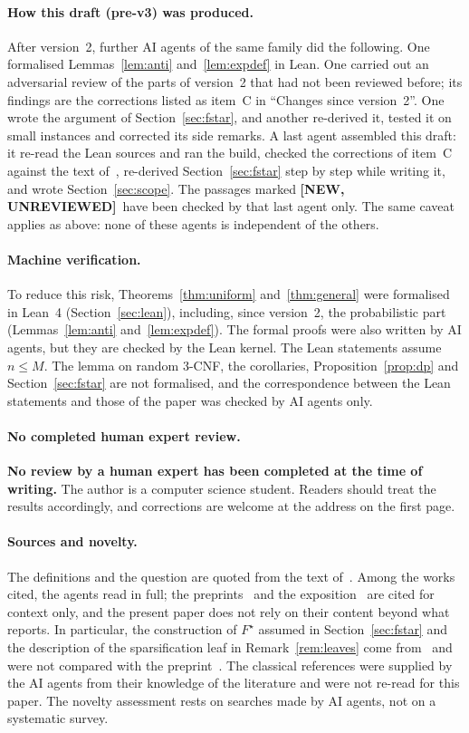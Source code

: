 \documentclass[11pt,a4paper]{article}
\newcommand{\NEWU}{\textbf{[NEW, UNREVIEWED]}}
\theoremstyle{definition}
\theoremstyle{remark}
\begin{document}
\paragraph{How this draft (pre-v3) was produced.} After version~2, further AI agents of the
same family did the following. One formalised Lemmas~\ref{lem:anti} and~\ref{lem:expdef} in
Lean. One carried out an adversarial review of the parts of version~2 that had not been
reviewed before; its findings are the corrections listed as item~C in ``Changes since
version~2''. One wrote the argument of Section~\ref{sec:fstar}, and another re-derived it,
tested it on small instances and corrected its side remarks. A last agent assembled this
draft: it re-read the Lean sources and ran the build, checked the corrections of item~C
against the text of~\cite{DL}, re-derived Section~\ref{sec:fstar} step by step while writing
it, and wrote Section~\ref{sec:scope}. The passages marked \NEWU\ have been checked by that
last agent only. The same caveat applies as above: none of these agents is independent of
the others.

\paragraph{Machine verification.} To reduce this risk, Theorems~\ref{thm:uniform}
and~\ref{thm:general} were formalised in Lean~4 (Section~\ref{sec:lean}), including, since
version~2, the probabilistic part (Lemmas~\ref{lem:anti} and~\ref{lem:expdef}). The formal
proofs were also written by AI agents, but they are checked by the Lean kernel. The Lean
statements assume $n\le M$. The lemma on random 3-CNF, the corollaries,
Proposition~\ref{prop:dp} and Section~\ref{sec:fstar} are not formalised, and the
correspondence between the Lean statements and those of the paper was checked by AI agents
only.

\paragraph{No completed human expert review.} \textbf{No review by a human expert has been
completed at the time of writing.} The author is a computer science student. Readers should treat the
results accordingly, and corrections are welcome at the address on the first page.

\paragraph{Sources and novelty.} The definitions and the question are quoted from the text
of~\cite{DL}. Among the works cited, the agents read \cite{DL} in full; the
preprints~\cite{OpenAI,Claude} and the exposition~\cite{ODonnell} are cited for context
only, and the present paper does not rely on their content beyond what~\cite{DL} reports.
In particular, the construction of $F^\star$ assumed in Section~\ref{sec:fstar} and the
description of the sparsification leaf in Remark~\ref{rem:leaves} come from~\cite{DL} and
were not compared with the preprint~\cite{OpenAI}.
The classical references were supplied by the AI agents from their knowledge of the
literature and were not re-read for this paper. The novelty assessment rests on searches made by AI
agents, not on a systematic survey.
\end{document}
